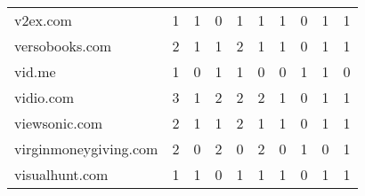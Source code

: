 \begin{tabular}{lrrrrrrrrr}
                   v2ex.com &                                1 &                                  1 &                                      0 &                            1 &                           1 &                                   1 &                                      0 &                             1 &                            1 \\
             versobooks.com &                                2 &                                  1 &                                      1 &                            2 &                           1 &                                   1 &                                      0 &                             1 &                            1 \\
                     vid.me &                                1 &                                  0 &                                      1 &                            1 &                           0 &                                   0 &                                      1 &                             1 &                            0 \\
                  vidio.com &                                3 &                                  1 &                                      2 &                            2 &                           2 &                                   1 &                                      0 &                             1 &                            1 \\
              viewsonic.com &                                2 &                                  1 &                                      1 &                            2 &                           1 &                                   1 &                                      0 &                             1 &                            1 \\
      virginmoneygiving.com &                                2 &                                  0 &                                      2 &                            0 &                           2 &                                   0 &                                      1 &                             0 &                            1 \\
             visualhunt.com &                                1 &                                  1 &                                      0 &                            1 &                           1 &                                   1 &                                      0 &                             1 &                            1 \\

\end{tabular}
